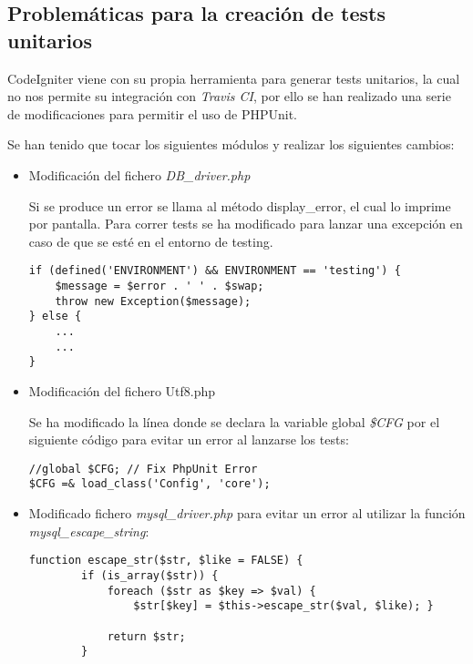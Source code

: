 \subsection{Problemáticas para la creación de tests unitarios}

CodeIgniter viene con su propia herramienta para generar tests unitarios, la cual no nos permite su integración con \emph{Travis CI}, por ello se han realizado una serie de modificaciones para permitir el uso de PHPUnit.

Se han tenido que tocar los siguientes módulos y realizar los siguientes cambios:

\begin{itemize}

    \item Modificación del fichero \emph{DB\_driver.php}

        Si se produce un error se llama al método display\_error, el cual lo imprime por pantalla. Para correr tests se ha modificado para lanzar una excepción en caso de que se esté en el entorno de testing.

                \begin{lstlisting}
if (defined('ENVIRONMENT') && ENVIRONMENT == 'testing') {
    $message = $error . ' ' . $swap;
    throw new Exception($message);
} else {
    ...
    ...
}
                \end{lstlisting}

    \item Modificación del fichero Utf8.php

        Se ha modificado la línea donde se declara la variable global \emph{\$CFG} por el siguiente código para evitar un error al lanzarse los tests:

                \begin{lstlisting}
//global $CFG; // Fix PhpUnit Error
$CFG =& load_class('Config', 'core');
                \end{lstlisting}

    \item Modificado fichero \emph{mysql\_driver.php} para evitar un error al utilizar la función \emph{mysql\_escape\_string}:

                \begin{lstlisting}
function escape_str($str, $like = FALSE) {
        if (is_array($str)) {
            foreach ($str as $key => $val) {
                $str[$key] = $this->escape_str($val, $like); }

            return $str;
        }


\end{lstlisting}
\end{itemize}
